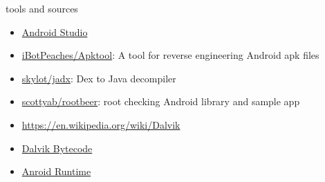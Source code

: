 \documentclass{beamer}
\begin{document}
\begin{frame}{tools and sources}

    \begin{itemize}
        \item \href{https://developer.android.com/studio}{Android Studio}
        \item \href{https://github.com/iBotPeaches/Apktool}{iBotPeaches/Apktool}:
        A tool for reverse engineering Android apk files
        \item \href{https://github.com/skylot/jadx}{skylot/jadx}: Dex to Java decompiler
        \item \href{https://github.com/scottyab/rootbeer}{scottyab/rootbeer}: root checking Android library and sample app
        \item \href{https://en.wikipedia.org/wiki/Dalvik}{https://en.wikipedia.org/wiki/Dalvik}
        \item \href{https://source.android.com/devices/tech/dalvik/dalvik-bytecode.html}{Dalvik Bytecode}
        \item \href{https://source.android.com/devices/architecture/modular-system/art}{Anroid Runtime}
    \end{itemize}
    
\end{frame}
\end{document}
